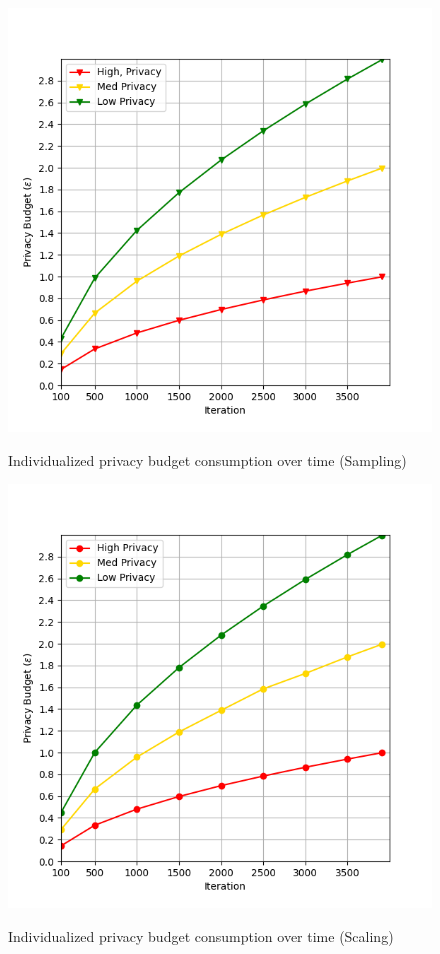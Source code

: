 \begin{figure}[htbp]
  \centering
  \begin{minipage}[b]{0.45\textwidth}
   \includegraphics[width=\linewidth]{submissions/submission5/figs/epsindividone.png}
   \caption{Individualized privacy budget consumption over time (Sampling)}\label{FigDiff}
   \label{sampleEps}
  \end{minipage}
  \hfill
  \begin{minipage}[b]{0.45\textwidth}
    \centering
    \includegraphics[width=\linewidth]{submissions/submission5/figs/epsindivid2.png}
   \caption{Individualized privacy budget consumption over time (Scaling)}\label{FigDiff}
   \label{scaleEps}
  \end{minipage}
  
\end{figure}

